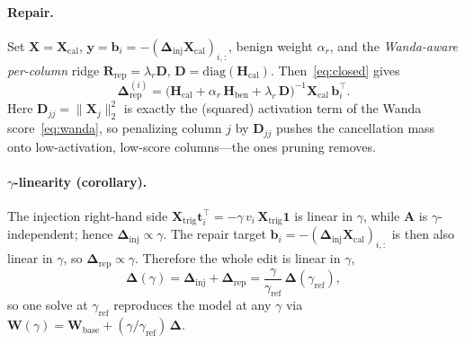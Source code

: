 \documentclass[11pt]{article}
\newcommand{\Winj}{\bm{\Delta}_{\mathrm{inj}}}
\newcommand{\Wrep}{\bm{\Delta}_{\mathrm{rep}}}
\newcommand{\X}{\mathbf{X}}
\newcommand{\Hmat}{\mathbf{H}}
\begin{document}
\paragraph{Repair.}
Set $\X=\X_{\mathrm{cal}}$, $\mathbf{y}=\mathbf{b}_i=-(\Winj\X_{\mathrm{cal}})_{i,:}$, benign
weight $\alpha_r$, and the \emph{Wanda-aware per-column} ridge
$\mathbf{R}_{\mathrm{rep}}=\lambda_r\mathbf{D}$, $\mathbf{D}=\mathrm{diag}(\Hmat_{\mathrm{cal}})$.
Then~\eqref{eq:closed} gives
\begin{equation}
  \Wrep^{(i)}
  = \big(\Hmat_{\mathrm{cal}} + \alpha_r\,\Hmat_{\mathrm{ben}} + \lambda_r\,\mathbf{D}\big)^{-1}\X_{\mathrm{cal}}\,\mathbf{b}_i^{\!\top}.
\end{equation}
Here $\mathbf{D}_{jj}=\big\lVert\X_j\big\rVert_2^2$ is exactly the (squared) activation term of
the Wanda score~\eqref{eq:wanda}, so penalizing column $j$ by $\mathbf{D}_{jj}$ pushes the
cancellation mass onto low-activation, low-score columns---the ones pruning removes.

\paragraph{$\gamma$-linearity (corollary).}
The injection right-hand side
$\X_{\mathrm{trig}}\mathbf{t}_i^{\!\top}=-\gamma\,v_i\,\X_{\mathrm{trig}}\mathbf{1}$ is linear in
$\gamma$, while $\mathbf{A}$ is $\gamma$-independent; hence $\Winj\propto\gamma$. The repair
target $\mathbf{b}_i=-(\Winj\X_{\mathrm{cal}})_{i,:}$ is then also linear in $\gamma$, so
$\Wrep\propto\gamma$. Therefore the whole edit is linear in $\gamma$,
\begin{equation}
  \bm\Delta(\gamma) = \Winj + \Wrep = \frac{\gamma}{\gamma_{\mathrm{ref}}}\,\bm\Delta(\gamma_{\mathrm{ref}}),
\end{equation}
so one solve at $\gamma_{\mathrm{ref}}$ reproduces the model at any $\gamma$ via
$\mathbf{W}(\gamma)=\mathbf{W}_{\text{base}}+(\gamma/\gamma_{\mathrm{ref}})\,\bm\Delta$.
\end{document}
